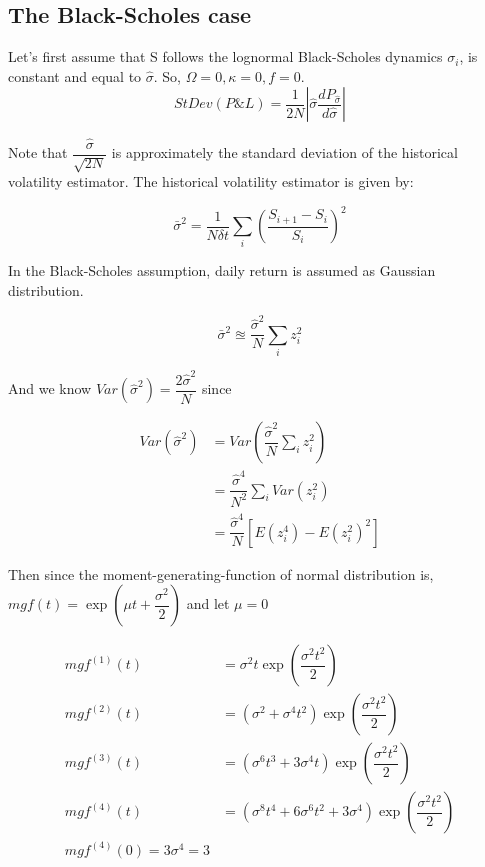 \documentclass[a4]{article}
\begin{document}
\subsection{The Black-Scholes case}
Let's first assume that S follows the lognormal Black-Scholes dynamics $\sigma_{i}$, is constant and equal to $\hat{\sigma}$. So, $\Omega = 0, \kappa = 0,f = 0$.
\begin{equation}\label{normstd}
StDev(P\&L) = \dfrac{1}{2N}\left|\hat{\sigma}\dfrac{dP_{\hat{\sigma}}}{d\hat{\sigma}}\right|
\end{equation}\par 
\noindent Note that $\dfrac{\hat{\sigma}}{\sqrt{2N}}$  is approximately the standard deviation of the historical volatility estimator. The historical volatility estimator is given by:\par 
\begin{equation}
\bar{\sigma}^{2} = \dfrac{1}{N\delta t}\sum_{i}\left(\dfrac{S_{i+1} - S_{i}}{S_{i}}\right)^{2}
\end{equation}\par 
In the Black-Scholes assumption, daily return is assumed as Gaussian distribution.\par 
\begin{equation}
\bar{\sigma}^{2}\approxeq \dfrac{\hat{\sigma}^{2}}{N}\sum_{i}z_{i}^{2}
\end{equation}\par 
And we know $Var(\hat{\sigma}^{2}) = \dfrac{2\hat{\sigma}^{2}}{N}$ since\par 
\begin{equation}
\begin{aligned}
Var(\hat{\sigma}^{2}) &= Var\left(\dfrac{\hat{\sigma}^{2}}{N}\sum_{i}z_{i}^{2}\right)\\
&=\dfrac{\hat{\sigma}^{4}}{N^{2}}\sum_{i}Var(z_{i}^{2})\\
&=\dfrac{\hat{\sigma}^{4}}{N}\left[E(z_{i}^{4})-E(z_{i}^{2})^{2}\right]
\end{aligned}
\end{equation}\par 
Then since the moment-generating-function of normal distribution is, $mgf(t)=\exp(\mu t + \dfrac{\sigma^{2}}{2})$ and let $\mu = 0$\par 
\begin{equation}
\begin{aligned}
mgf^{(1)}(t)&=\sigma^{2}t\exp(\dfrac{\sigma^{2}t^{2}}{2})\\
mgf^{(2)}(t)&=(\sigma^{2}+\sigma^{4}t^{2})\exp(\dfrac{\sigma^{2}t^{2}}{2})\\
mgf^{(3)}(t)&=(\sigma^{6}t^{3}+3\sigma^{4}t )\exp(\dfrac{\sigma^{2}t^{2}}{2})\\
mgf^{(4)}(t)&=(\sigma^{8}t^{4} + 6\sigma^{6}t^{2}+3\sigma^{4})\exp(\dfrac{\sigma^{2}t^{2}}{2})\\
mgf^{(4)}(0) = 3\sigma^{4}=3
\end{aligned}
\end{equation}
\end{document}
